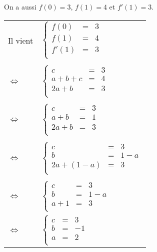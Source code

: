 On a aussi $f(0) = 3$, $f(1) = 4$ et $f'(1) = 3$. \\

\begin{tabular}{ll}
Il vient & $\left\{
  \begin{array}{rll}
    f(0) & = & 3 \\
    f(1) & = & 4 \\
    f'(1)& = & 3 \\
  \end{array}
\right.$ \\

& \\

$\Longleftrightarrow$ & $\left\{
  \begin{array}{rll}
    c & = & 3 \\
    a+b+c & = & 4 \\
    2a+b& = & 3 \\
  \end{array}
\right.$ \\

& \\

$\Longleftrightarrow$ & $\left\{
  \begin{array}{rll}
    c & = & 3 \\
    a+b & = & 1 \\
    2a+b & = & 3 \\
  \end{array}
\right.$ \\

& \\

$\Longleftrightarrow$ & $\left\{
  \begin{array}{rll}
    c & = & 3 \\
    b & = & 1 - a \\
    2a+\left(1-a\right) & = & 3 \\
  \end{array}
\right.$ \\

& \\

$\Longleftrightarrow$ & $\left\{
  \begin{array}{rll}
    c & = & 3 \\
    b & = & 1 - a \\
    a+1 & = & 3 \\
  \end{array}
\right.$ \\

$\Longleftrightarrow$ & $\left\{
  \begin{array}{rll}
    c & = & 3 \\
    b & = & -1 \\
    a & = & 2 \\
  \end{array}
\right.$ \\
\end{tabular}

